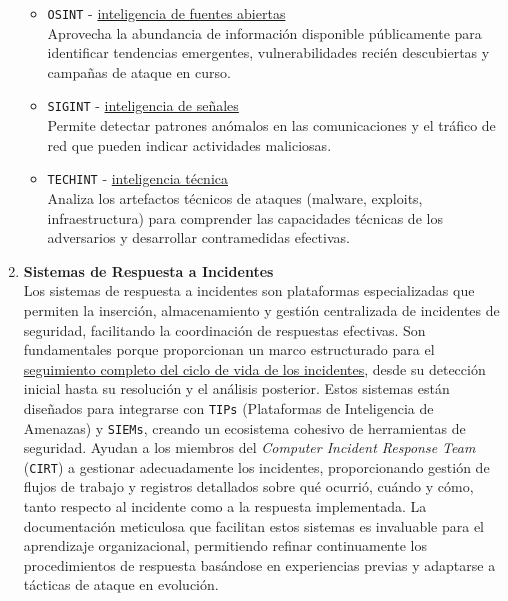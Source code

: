\begin{enumerate}[resume]
\begin{itemize}
   \item \texttt{OSINT} - \ul{inteligencia de fuentes abiertas}\\
   Aprovecha la abundancia de información disponible públicamente para identificar tendencias emergentes, vulnerabilidades recién descubiertas y campañas de ataque en curso. 
   
   \item \texttt{SIGINT} - \ul{inteligencia de señales}\\
   Permite detectar patrones anómalos en las comunicaciones y el tráfico de red que pueden indicar actividades maliciosas. 
   
   \item \texttt{TECHINT} - \ul{inteligencia técnica}\\
   Analiza los artefactos técnicos de ataques (malware, exploits, infraestructura) para comprender las capacidades técnicas de los adversarios y desarrollar contramedidas efectivas.
   
\end{itemize} 


\item \textbf{Sistemas de Respuesta a Incidentes} \\
Los sistemas de respuesta a incidentes son plataformas especializadas que permiten la inserción, almacenamiento y gestión centralizada de incidentes de seguridad, facilitando la coordinación de respuestas efectivas. Son fundamentales porque proporcionan un marco estructurado para el \ul{seguimiento completo del ciclo de vida de los incidentes}, desde su detección inicial hasta su resolución y el análisis posterior. Estos sistemas están diseñados para integrarse con \texttt{TIPs} (Plataformas de Inteligencia de Amenazas) y \texttt{SIEMs}, creando un ecosistema cohesivo de herramientas de seguridad. Ayudan a los miembros del \textit{Computer Incident Response Team} (\texttt{CIRT}) a gestionar adecuadamente los incidentes, proporcionando gestión de flujos de trabajo y registros detallados sobre qué ocurrió, cuándo y cómo, tanto respecto al incidente como a la respuesta implementada. La documentación meticulosa que facilitan estos sistemas es invaluable para el aprendizaje organizacional, permitiendo refinar continuamente los procedimientos de respuesta basándose en experiencias previas y adaptarse a tácticas de ataque en evolución.


\end{enumerate}
